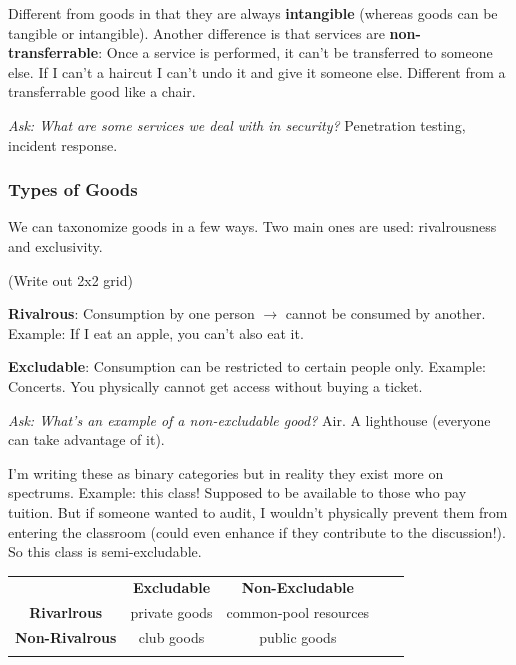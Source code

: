 \documentclass[11pt]{article}
\begin{document}
Different from goods in that they are always {\bf intangible} (whereas goods can be tangible or intangible). 
Another difference is that services are {\bf non-transferrable}: Once a service is performed, it can't be transferred to someone else. 
If I can't a haircut I can't undo it and give it someone else.
Different from a transferrable good like a chair.

{\it Ask: What are some services we deal with in security?} Penetration testing, incident response. 

\subsubsection{Types of Goods}

We can taxonomize goods in a few ways.
Two main ones are used: rivalrousness and exclusivity.

(Write out 2x2 grid)

{\bf Rivalrous}: Consumption by one person $\rightarrow$ cannot be consumed by another.
Example: If I eat an apple, you can't also eat it.  

{\bf Excludable}: Consumption can be restricted to certain people only. 
Example: Concerts. You physically cannot get access without buying a ticket.

{\it Ask: What's an example of a non-excludable good?} Air. A lighthouse (everyone can take advantage of it).

I'm writing these as binary categories but in reality they exist more on spectrums.
Example: this class! Supposed to be available to those who pay tuition. But if someone wanted to audit, I wouldn't physically prevent them from entering the classroom (could even enhance if they contribute to the discussion!). So this class is semi-excludable.

\begin{table}[]
    \centering
    \begin{tabular}{lccll}
    \cline{1-3}
    \multicolumn{1}{|l|}{\cellcolor[HTML]{EFEFEF}}                       & \multicolumn{1}{c|}{\cellcolor[HTML]{EFEFEF}\textbf{Excludable}} & \multicolumn{1}{c|}{\cellcolor[HTML]{EFEFEF}\textbf{Non-Excludable}} &  &  \\ \cline{1-3}
    \multicolumn{1}{|c|}{\cellcolor[HTML]{EFEFEF}\textbf{Rivarlrous}}    & \multicolumn{1}{c|}{private goods}                               & \multicolumn{1}{c|}{common-pool resources}                           &  &  \\ \cline{1-3}
    \multicolumn{1}{|c|}{\cellcolor[HTML]{EFEFEF}\textbf{Non-Rivalrous}} & \multicolumn{1}{c|}{club goods}                                  & \multicolumn{1}{c|}{public goods}                                    &  &  \\ \cline{1-3}
                                                                            & \multicolumn{1}{l}{}                                             & \multicolumn{1}{l}{}                                                 &  & 
    \end{tabular}
\end{table}
\end{document}
